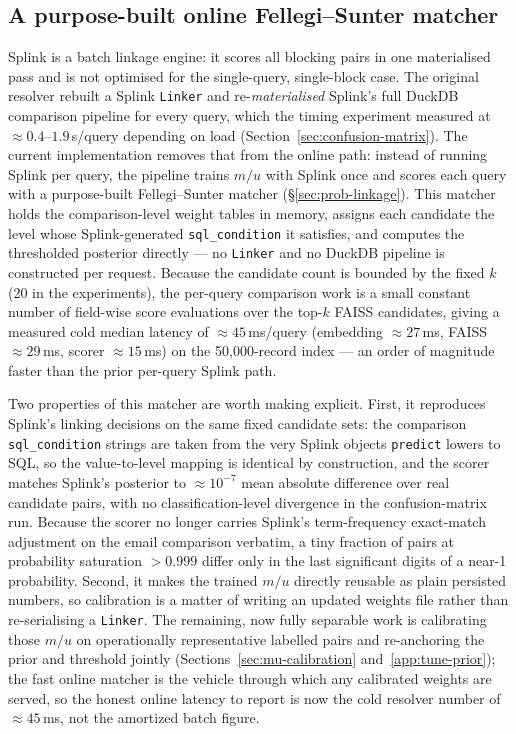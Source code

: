 \documentclass[11pt]{article}
\begin{document}
\subsection{A purpose-built online Fellegi--Sunter matcher}
\label{sec:online-fs}
Splink is a batch linkage engine: it scores all blocking pairs in one materialised pass and is not optimised for the single-query, single-block case. The original resolver rebuilt a Splink \texttt{Linker} and re-\emph{materialised} Splink's full DuckDB comparison pipeline for every query, which the timing experiment measured at $\approx 0.4$--$1.9$\,s/query depending on load (Section~\ref{sec:confusion-matrix}). The current implementation removes that from the online path: instead of running Splink per query, the pipeline trains $m/u$ with Splink once and scores each query with a purpose-built Fellegi--Sunter matcher (§\ref{sec:prob-linkage}). This matcher holds the comparison-level weight tables in memory, assigns each candidate the level whose Splink-generated \texttt{sql\_condition} it satisfies, and computes the thresholded posterior directly --- no \texttt{Linker} and no DuckDB pipeline is constructed per request. Because the candidate count is bounded by the fixed $k$ (20 in the experiments), the per-query comparison work is a small constant number of field-wise score evaluations over the top-$k$ FAISS candidates, giving a measured cold median latency of $\approx 45$\,ms/query (embedding $\approx 27$\,ms, FAISS $\approx 29$\,ms, scorer $\approx 15$\,ms) on the 50{,}000-record index --- an order of magnitude faster than the prior per-query Splink path.

Two properties of this matcher are worth making explicit. First, it reproduces Splink's linking decisions on the same fixed candidate sets: the comparison \texttt{sql\_condition} strings are taken from the very Splink objects \texttt{predict} lowers to SQL, so the value-to-level mapping is identical by construction, and the scorer matches Splink's posterior to $\approx 10^{-7}$ mean absolute difference over real candidate pairs, with no classification-level divergence in the confusion-matrix run. Because the scorer no longer carries Splink's term-frequency exact-match adjustment on the email comparison verbatim, a tiny fraction of pairs at probability saturation $>0.999$ differ only in the last significant digits of a near-1 probability. Second, it makes the trained $m/u$ directly reusable as plain persisted numbers, so calibration is a matter of writing an updated weights file rather than re-serialising a \texttt{Linker}. The remaining, now fully separable work is calibrating those $m/u$ on operationally representative labelled pairs and re-anchoring the prior and threshold jointly (Sections~\ref{sec:mu-calibration} and~\ref{app:tune-prior}); the fast online matcher is the vehicle through which any calibrated weights are served, so the honest online latency to report is now the cold resolver number of $\approx 45$\,ms, not the amortized batch figure.
\end{document}
